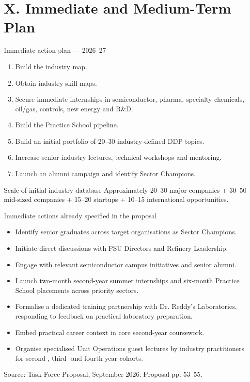 \documentclass[aspectratio=169,11pt]{beamer}
\newcommand{\sourcefoot}[1]{\vfill\tiny\color{gray}Source: Task Force Proposal, September 2026. #1}
\begin{document}
\section{X. Immediate and Medium-Term Plan}
\begin{frame}{Immediate action plan — 2026--27}
\begin{enumerate}
\item Build the industry map.
\item Obtain industry skill maps.
\item Secure immediate internships in semiconductor, pharma, specialty chemicals, oil/gas, controls, new energy and R\&D.
\item Build the Practice School pipeline.
\item Build an initial portfolio of 20--30 industry-defined DDP topics.
\item Increase senior industry lectures, technical workshops and mentoring.
\item Launch an alumni campaign and identify Sector Champions.
\end{enumerate}
\vspace{3mm}
\begin{block}{Scale of initial industry database}
Approximately 20--30 major companies + 30--50 mid-sized companies + 15--20 startups + 10--15 international opportunities.
\end{block}
\end{frame}

\begin{frame}{Immediate actions already specified in the proposal}
\begin{itemize}
\item Identify senior graduates across target organisations as Sector Champions.
\item Initiate direct discussions with PSU Directors and Refinery Leadership.
\item Engage with relevant semiconductor campus initiatives and senior alumni.
\item Launch two-month second-year summer internships and six-month Practice School placements across priority sectors.
\item Formalise a dedicated training partnership with Dr. Reddy's Laboratories, responding to feedback on practical laboratory preparation.
\item Embed practical career context in core second-year coursework.
\item Organise specialised Unit Operations guest lectures by industry practitioners for second-, third- and fourth-year cohorts.
\end{itemize}
\sourcefoot{Proposal pp. 53--55.}
\end{frame}
\end{document}
